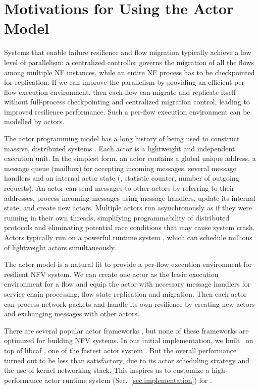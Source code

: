 \section{Motivations for Using the Actor Model}

Systems that enable failure resilience \cite{sherry2015rollback,rajagopalan2013pico} and flow migration \cite{rajagopalan2013split, gember2015opennf} typically achieve a low level of parallelism: a centralized controller governs the migration of all the flows among multiple NF instances, while an entire NF process has to be checkpointed for replication. If we can improve the parallelism by providing an efficient per-flow execution environment, then each flow can migrate and replicate itself without full-process checkpointing and centralized migration control, leading to improved resilience performance. Such a per-flow execution environment can be modelled by actors.

The actor programming model \cite{actor-wiki, erlang, akka, caf} has a long history of being used to construct massive, distributed systems \cite{actor-wiki, akka, newell2016optimizing, AnalysisActor}. Each actor is a lightweight and independent execution unit. In the simplest form, an actor contains a global unique address, a message queue (mailbox) for accepting incoming messages, several message handlers and an internal actor state (\eg, statistic counter, number of outgoing requests). An actor can send messages to other actors by referring to their addresses, process incoming messages using message handlers, update its internal state, and create new actors. Multiple actors run asynchronously as if they were running in their own threads, simplifying programmability of distributed protocols and eliminating potential race conditions that may cause system crash. Actors typically run on a powerful runtime system \cite{caf}, which can schedule millions of lightweight actors simultaneously.

The actor model is a natural fit to provide a per-flow execution environment for resilient NFV system. We can create one actor as the basic execution environment for a flow and equip the actor with necessary message handlers for service chain processing, flow state replication and migration. Then each actor can process network packets and handle its own resilience by creating new actors and exchanging messages with other actors.

There are several popular actor frameworks \cite{akka, erlang, Orleans, caf}, but none of these frameworks are optimized for building NFV systems. In our initial implementation, we built \nfactor~on top of libcaf \cite{caf}, one of the fastest actor system \cite{chs-rapc-16}. But the overall performance turned out to be less than satisfactory, due to its actor scheduling strategy and the use of kernel networking stack. This inspires us to customize a high-performance actor runtime system (Sec.~\ref{sec:implementation}) for \nfactor.
